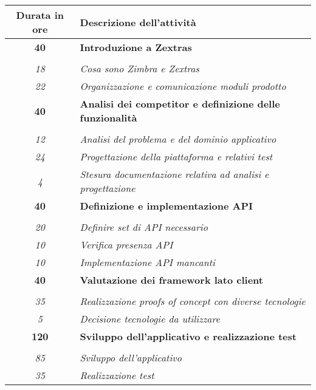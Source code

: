 

\begin{tabularx}{\textwidth}{|c|X|}
	\hline
	\textbf{Durata in ore} & \textbf{Descrizione dell'attività} \\\hline
	
	\textbf{40} & \textbf{Introduzione a Zextras} \\ \hdashline 
	\multirow{2}{0cm}\\ 
    \textit{18} & 
    \textit{Cosa sono Zimbra e Zextras} \\
    \textit{22} & 
    \textit{Organizzazione e comunicazione moduli prodotto} \\	 
    \hline
    
    
    
    \textbf{40} & \textbf{Analisi dei competitor e definizione delle funzionalità} \\ \hdashline 
    \multirow{3}{0cm}\\ 
    \textit{12} & 
    \textit{Analisi del problema e del dominio applicativo} \\
    \textit{24} & 
    \textit{Progettazione della piattaforma e relativi test} \\
    \textit{4} & 
    \textit{Stesura documentazione relativa ad analisi e progettazione} \\
    \hline  
    
    
     
       \textbf{40} & \textbf{Definizione e implementazione API} \\ \hdashline 
    \multirow{3}{0cm}\\ 
    \textit{20} & 
    \textit{Definire set di API necessario} \\
    \textit{10} & 
    \textit{Verifica presenza API} \\
    \textit{10} & 
    \textit{Implementazione API mancanti} \\
    \hline 
    
    
    \textbf{40} & \textbf{Valutazione dei framework lato client} \\ \hdashline 
    \multirow{2}{0cm}\\ 
    \textit{35} & 
    \textit{Realizzazione proofs of concept con diverse tecnologie} \\
    \textit{5} & 
    \textit{Decisione tecnologie da utilizzare} \\
    \hline 
    
	\textbf{120} & \textbf{Sviluppo dell'applicativo e realizzazione test} \\ 		\hdashline 
    \multirow{2}{0cm}\\ 
    \textit{85} & 
    \textit{Sviluppo dell'applicativo} \\
    \textit{35} & 
    \textit{Realizzazione test} \\
    \hline     
    

\end{tabularx}
